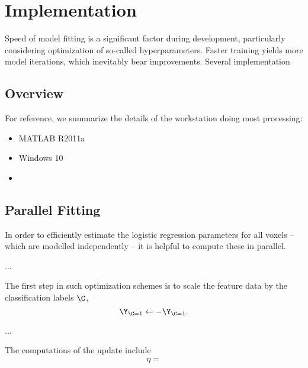 \chapter{Implementation}
Speed of model fitting is a significant factor during development, particularly considering optimization of so-called hyperparameters. Faster training yields more model iterations, which inevitably bear improvements. Several implementation 
\section{Overview}
For reference, we summarize the details of the workstation doing most processing:
\begin{itemize}
  \item MATLAB R2011a
  \item Windows 10
  \item 
\end{itemize}
\section{Parallel Fitting}
In order to efficiently estimate the logistic regression parameters for all voxels -- which are modelled independently -- it is helpful to compute these in parallel.
\par...\par
The first step in such optimization schemes is to scale the feature data by the classification labels $\C$,
\begin{equation}
  \Y_{\C=1} \leftarrow -\Y_{\C=1}.
\end{equation}
\par...\par
The computations of the update include
\begin{align*}
  \eta = 
\end{align*}

